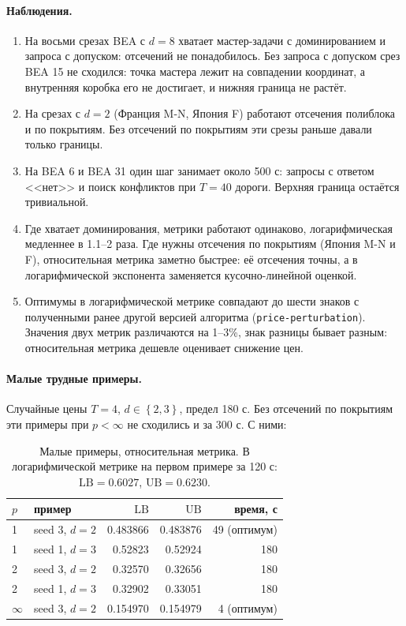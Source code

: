 \documentclass[a4paper,11pt]{article}
\theoremstyle{plain}
\theoremstyle{definition}
\theoremstyle{remark}
\newcommand{\set}[1]{\left\{ #1 \right\}}
\newcommand{\LB}{\mathrm{LB}}
\newcommand{\UB}{\mathrm{UB}}
\begin{document}
\paragraph{Наблюдения.}
\begin{enumerate}
    \item На восьми срезах BEA с $d=8$ хватает мастер-задачи с доминированием и запроса с допуском: отсечений не понадобилось. Без запроса с допуском срез BEA 15 не сходился: точка мастера лежит на совпадении координат, а внутренняя коробка его не достигает, и нижняя граница не растёт.
    \item На срезах с $d=2$ (Франция M-N, Япония F) работают отсечения полиблока и по покрытиям. Без отсечений по покрытиям эти срезы раньше давали только границы.
    \item На BEA 6 и BEA 31 один шаг занимает около 500 с: запросы с ответом <<нет>> и поиск конфликтов при $T=40$ дороги. Верхняя граница остаётся тривиальной.
    \item Где хватает доминирования, метрики работают одинаково, логарифмическая медленнее в 1.1--2 раза. Где нужны отсечения по покрытиям (Япония M-N и F), относительная метрика заметно быстрее: её отсечения точны, а в логарифмической экспонента заменяется кусочно-линейной оценкой.
    \item Оптимумы в логарифмической метрике совпадают до шести знаков с полученными ранее другой версией алгоритма (\texttt{price-perturbation}). Значения двух метрик различаются на 1--3\%, знак разницы бывает разным: относительная метрика дешевле оценивает снижение цен.
\end{enumerate}

\paragraph{Малые трудные примеры.} Случайные цены $T=4$, $d\in\set{2,3}$, предел 180 с. Без отсечений по покрытиям эти примеры при $p<\infty$ не сходились и за 300 с. С ними:

\begin{table}[H]
\centering
\begin{tabular}{llrrr}
\toprule
$p$ & пример & $\LB$ & $\UB$ & время, с\\
\midrule
1 & seed 3, $d=2$ & 0.483866 & 0.483876 & 49 (оптимум)\\
1 & seed 1, $d=3$ & 0.52823 & 0.52924 & 180\\
2 & seed 3, $d=2$ & 0.32570 & 0.32656 & 180\\
2 & seed 1, $d=3$ & 0.32902 & 0.33051 & 180\\
$\infty$ & seed 3, $d=2$ & 0.154970 & 0.154979 & 4 (оптимум)\\
\bottomrule
\end{tabular}
\caption{Малые примеры, относительная метрика. В логарифмической метрике на первом примере за 120 с: $\LB=0.6027$, $\UB=0.6230$.}
\label{tab:small}
\end{table}
\end{document}
